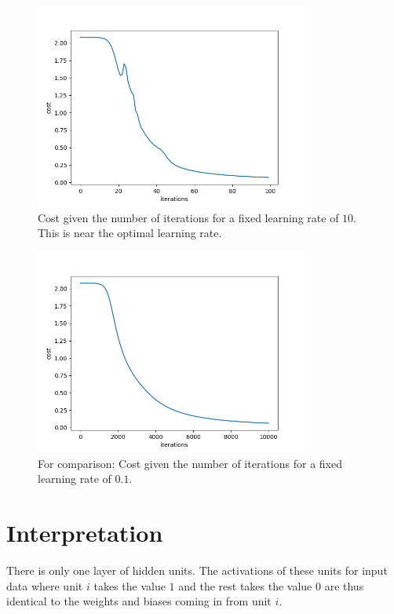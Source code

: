 \documentclass[conference]{IEEEtran}
\begin{document}
\begin{figure}
    \centering
    \includegraphics[width=9cm]{cost1.png}
    \caption{Cost given the number of iterations for a fixed learning rate of $10$. This is near the optimal learning rate.}
    \label{fig:cost1}
\end{figure}

\begin{figure}
    \centering
    \includegraphics[width=9cm]{cost2.png}
    \caption{For comparison: Cost given the number of iterations for a fixed learning rate of $0.1$.}
    \label{fig:cost2}
\end{figure}

\section{Interpretation}

There is only one layer of hidden units. The activations of these units for input data where unit $i$ takes the value $1$ and the rest takes the value $0$ are thus identical to the weights and biases coming in from unit $i$. 
\end{document}
